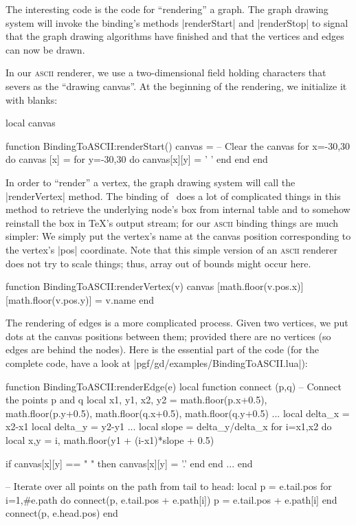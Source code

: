 The interesting code is the code for ``rendering'' a graph. The graph drawing
system will invoke the binding's methods |renderStart| and |renderStop| to
signal that the graph drawing algorithms have finished and that the vertices
and edges can now be drawn.

In our \textsc{ascii} renderer, we use a two-dimensional field holding
characters that severs as the ``drawing canvas''. At the beginning of the
rendering, we initialize it with blanks:
%
\begin{codeexample}
local canvas

function BindingToASCII:renderStart()
  canvas = {}
  -- Clear the canvas
  for x=-30,30 do
    canvas [x] = {}
    for y=-30,30 do
      canvas[x][y] = ' '
    end
  end
end
\end{codeexample}

In order to ``render'' a vertex, the graph drawing system will call the
|renderVertex| method. The binding of \tikzname\ does a lot of complicated
things in this method to retrieve the underlying node's box from internal table
and to somehow reinstall the box in \TeX's output stream; for our
\textsc{ascii} binding things are much simpler: We simply put the vertex's name
at the canvas position corresponding to the vertex's |pos| coordinate. Note
that this simple version of an \textsc{ascii} renderer does not try to scale
things; thus, array out of bounds might occur here.
%
\begin{codeexample}
function BindingToASCII:renderVertex(v)
  canvas [math.floor(v.pos.x)][math.floor(v.pos.y)] = v.name
end
\end{codeexample}

The rendering of edges is a more complicated process. Given two vertices, we
put dots at the canvas positions between them; provided there are no vertices
(so edges are behind the nodes). Here is the essential part of the code (for
the complete code, have a look at |pgf/gd/examples/BindingToASCII.lua|):
%
\begin{codeexample}
function BindingToASCII:renderEdge(e)
  local function connect (p,q)
    -- Connect the points p and q
    local x1, y1, x2, y2 = math.floor(p.x+0.5), math.floor(p.y+0.5), math.floor(q.x+0.5), math.floor(q.y+0.5)
    ...
    local delta_x = x2-x1
    local delta_y = y2-y1
    ...
      local slope = delta_y/delta_x
      for i=x1,x2 do
        local x,y = i, math.floor(y1 + (i-x1)*slope + 0.5)

        if canvas[x][y] == " " then
          canvas[x][y] = '.'
        end
      end
    ...
  end

  -- Iterate over all points on the path from tail to head:
  local p = e.tail.pos
  for i=1,#e.path do
    connect(p, e.tail.pos + e.path[i])
    p = e.tail.pos + e.path[i]
  end
  connect(p, e.head.pos)
end
\end{codeexample}


